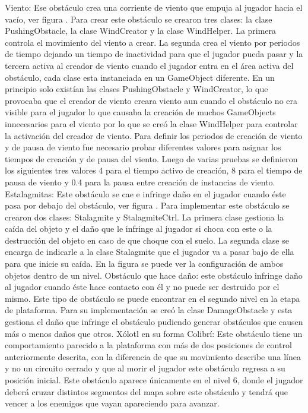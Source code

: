 Viento: Ese obstáculo crea una corriente de viento que empuja al jugador hacia el vacío, ver figura . Para crear este obstáculo se crearon tres clases: la clase PushingObstacle, la clase WindCreator y la clase WindHelper. La primera controla el movimiento del viento a crear. La segunda crea el viento por periodos de tiempo dejando un tiempo de inactividad para que el jugador pueda pasar y la tercera activa al creador de viento cuando el jugador entra en el área activa del obstáculo, cada clase esta instanciada en un GameObject diferente. En un principio solo existían las clases PushingObstacle y WindCreator, lo que provocaba que el creador de viento creara viento aun cuando el obstáculo no era visible para el jugador lo que causaba la creación de muchos GameObjects innecesarios para el viento por lo que se creó la clase WindHelper para controlar la activación del creador de viento.  Para definir los periodos de creación de viento y de pausa de viento fue necesario probar diferentes valores para asignar los tiempos de creación y de pausa del viento. Luego de varias pruebas se definieron los siguientes tres valores 4 para el tiempo activo de creación, 8 para el tiempo de pausa de viento y 0.4 para la pausa entre creación de instancias de viento.
Estalagmitas: Este obstáculo se cae e infringe daño en el jugador cuando éste pasa por debajo del obstáculo, ver figura .  Para implementar este obstáculo se crearon dos clases: Stalagmite y StalagmiteCtrl. La primera clase gestiona la caída del objeto y el daño que le infringe al jugador si choca con este o la destrucción del objeto en caso de que choque con el suelo. La segunda clase se encarga de indicarle a la clase Stalagmite que el jugador va a pasar bajo de ella para que inicie su caída.  En la figura se puede ver la configuración de ambos objetos dentro de un nivel.
Obstáculo que hace daño: este obstáculo infringe daño al jugador cuando éste hace contacto con él y no puede ser destruido por el mismo. Este tipo de obstáculo se puede encontrar en el segundo nivel en la etapa de plataforma. Para su implementación se creó la clase DamageObstacle y esta gestiona el daño que infringe el obstáculo pudiendo generar obstáculos que causen más o menos daños que otros.
Xólotl en su forma Colibrí: Este obstáculo tiene un comportamiento parecido a la plataforma con más de dos posiciones de control anteriormente descrita, con la diferencia de que su movimiento describe una línea y no un circuito cerrado y que al morir el jugador este obstáculo regresa a su posición inicial. Este obstáculo aparece únicamente en el nivel 6, donde el jugador deberá cruzar distintos segmentos del mapa sobre este obstáculo y tendrá que vencer a los enemigos que vayan apareciendo para avanzar.


